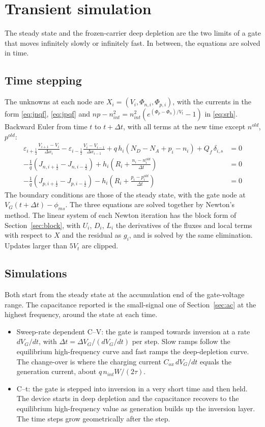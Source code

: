 \documentclass[11pt]{article}
\newcommand{\half}{\tfrac{1}{2}}
\begin{document}
\section{Transient simulation}
The steady state and the frozen-carrier deep depletion are the two limits of a gate that moves infinitely
slowly or infinitely fast. In between, the equations are solved in time.

\subsection{Time stepping}
The unknowns at each node are $X_i=(V_i,\Phi_{n,i},\Phi_{p,i})$, with the currents in the form
\eqref{eq:jnqf}, \eqref{eq:jpqf} and $np-n_{int}^2=n_{int}^2\left(e^{(\Phi_p-\Phi_n)/V_t}-1\right)$ in
\eqref{eq:srh}. Backward Euler from time $t$ to $t+\Delta t$, with all terms at the new time except
$n^{old}$, $p^{old}$:
\begin{align}
\varepsilon_{i+\half}\frac{V_{i+1}-V_i}{\Delta x_i}-\varepsilon_{i-\half}\frac{V_i-V_{i-1}}{\Delta x_{i-1}}
+q\,h_i\left(N_D-N_A+p_i-n_i\right)+Q_f\,\delta_{i,s}&=0\\
-\frac1q\left(J_{n,i+\half}-J_{n,i-\half}\right)+h_i\left(R_i+\frac{n_i-n_i^{old}}{\Delta t}\right)&=0\\
-\frac1q\left(J_{p,i+\half}-J_{p,i-\half}\right)-h_i\left(R_i+\frac{p_i-p_i^{old}}{\Delta t}\right)&=0
\end{align}
The boundary conditions are those of the steady state, with the gate node at $V_G(t+\Delta t)-\phi_{ms}$.
The three equations are solved together by Newton's method. The linear system of each Newton iteration
has the block form of Section~\ref{sec:block}, with $U_i$, $D_i$, $L_i$ the derivatives of the fluxes and
local terms with respect to $X$ and the residual as $g_i$, and is solved by the same elimination. Updates
larger than $5V_t$ are clipped.

\subsection{Simulations}
Both start from the steady state at the accumulation end of the gate-voltage range. The capacitance
reported is the small-signal one of Section~\ref{sec:ac} at the highest frequency, around the state at
each time.
\begin{itemize}
\item Sweep-rate dependent C--V: the gate is ramped towards inversion at a rate $dV_G/dt$, with
$\Delta t=\Delta V_G/(dV_G/dt)$ per step. Slow ramps follow the equilibrium high-frequency curve and fast
ramps the deep-depletion curve. The change-over is where the charging current $C_{ox}\,dV_G/dt$ equals the
generation current, about $q\,n_{int}W/(2\tau)$.
\item C--t: the gate is stepped into inversion in a very short time and then held. The device starts in
deep depletion and the capacitance recovers to the equilibrium high-frequency value as generation builds up
the inversion layer. The time steps grow geometrically after the step.
\end{itemize}
\end{document}
